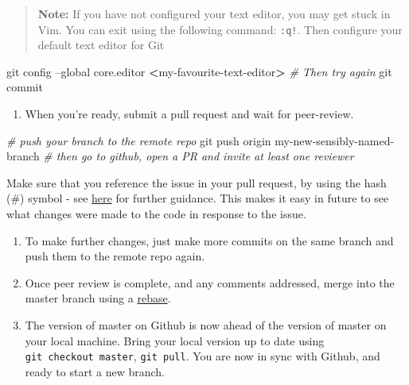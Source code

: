\documentclass[]{book}
\newenvironment{Shaded}{\begin{snugshade}}{\end{snugshade}}
\newcommand{\CommentTok}[1]{\textcolor[rgb]{0.56,0.35,0.01}{\textit{#1}}}
\newcommand{\FunctionTok}[1]{\textcolor[rgb]{0.00,0.00,0.00}{#1}}
\newcommand{\NormalTok}[1]{#1}
\newcommand{\OperatorTok}[1]{\textcolor[rgb]{0.81,0.36,0.00}{\textbf{#1}}}
\providecommand{\tightlist}{%
  \setlength{\itemsep}{0pt}\setlength{\parskip}{0pt}}
\begin{document}
\begin{quote}
\textbf{Note:}
If you have not configured your text editor, you may get stuck in Vim. You can exit using the following command: \texttt{:q!}. Then configure your default text editor for Git
\end{quote}

\begin{Shaded}
\begin{Highlighting}[]
\FunctionTok{git}\NormalTok{ config --global core.editor }\OperatorTok{<}\NormalTok{my-favourite-text-editor}\OperatorTok{>}
 \CommentTok{# Then try again}
\FunctionTok{git}\NormalTok{ commit}
\end{Highlighting}
\end{Shaded}

\begin{enumerate}
\def\labelenumi{\arabic{enumi}.}
\setcounter{enumi}{4}
\tightlist
\item
  When you're ready, submit a pull request and wait for peer-review.
\end{enumerate}

\begin{Shaded}
\begin{Highlighting}[]
\CommentTok{# push your branch to the remote repo}
\FunctionTok{git}\NormalTok{ push origin my-new-sensibly-named-branch}
\CommentTok{# then go to github, open a PR and invite at least one reviewer}
\end{Highlighting}
\end{Shaded}

Make sure that you reference the issue in your pull request, by using the hash (\#) symbol - see \href{https://help.github.com/articles/autolinked-references-and-urls/}{here} for further guidance. This makes it easy in future to see what changes were made to the code in response to the issue.

\begin{enumerate}
\def\labelenumi{\arabic{enumi}.}
\setcounter{enumi}{5}
\item
  To make further changes, just make more commits on the same branch and push them to the remote repo again.
\item
  Once peer review is complete, and any comments addressed, merge into the master branch using a \href{https://github.com/blog/2243-rebase-and-merge-pull-requests}{rebase}.
\item
  The version of master on Github is now ahead of the version of master on your local machine. Bring your local version up to date using \texttt{git\ checkout\ master}, \texttt{git\ pull}. You are now in sync with Github, and ready to start a new branch.
\end{enumerate}
\end{document}
